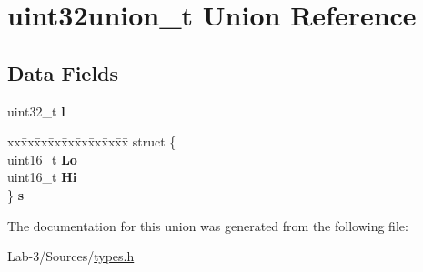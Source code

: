 \hypertarget{unionuint32union__t}{}\section{uint32union\+\_\+t Union Reference}
\label{unionuint32union__t}
\subsection*{Data Fields}
\begin{DoxyCompactItemize}
\item 
\mbox{\label{unionuint32union__t_a1b064e2f6a6eae2b71e0444d64736a36}} 
uint32\+\_\+t {\bfseries l}
\item 
\mbox{\label{unionuint32union__t_af7e6e4c0b5721482ec662bb956b617f7}} 
\begin{tabbing}
xx\=xx\=xx\=xx\=xx\=xx\=xx\=xx\=xx\=\kill
struct \{\\
\>uint16\_t {\bfseries Lo}\\
\>uint16\_t {\bfseries Hi}\\
\} {\bfseries s}\\

\end{tabbing}\end{DoxyCompactItemize}


The documentation for this union was generated from the following file\+:\begin{DoxyCompactItemize}
\item 
Lab-\/3/\+Sources/\hyperlink{types_8h}{types.\+h}\end{DoxyCompactItemize}
